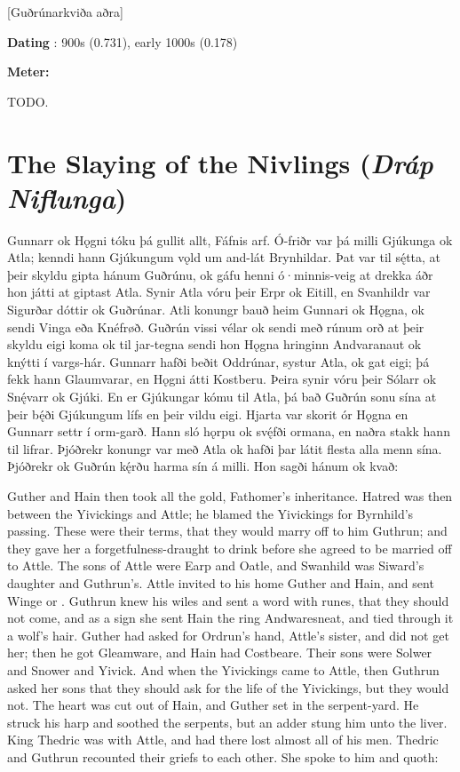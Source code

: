 [Guðrúnarkviða aðra]

\begin{flushright}%
\textbf{Dating} \parencite{Sapp2022}: 900s (0.731), early 1000s (0.178)

\textbf{Meter:} \Fornyrdislag%
\end{flushright}

TODO.

\sectionline

\section{The Slaying of the Nivlings (\emph{Dráp Niflunga})}

\bpg\bpa Gunnarr ok Hǫgni tóku þá gullit allt, Fáfnis arf. Ó-friðr var þá milli Gjúkunga ok Atla; kenndi hann Gjúkungum vǫld um and-lát Brynhildar. Þat var til sę́tta, at þeir skyldu gipta hánum Guðrúnu, ok gáfu henni ó·minnis-veig at drekka áðr hon játti at giptast Atla. Synir Atla vóru þeir Erpr ok Eitill, en Svanhildr var Sigurðar dóttir ok Guðrúnar. Atli konungr bauð heim Gunnari ok Hǫgna, ok sendi Vinga eða Knéfrøð. Guðrún vissi vélar ok sendi með rúnum orð at þeir skyldu eigi koma ok til jar-tegna sendi hon Hǫgna hringinn Andvaranaut ok knýtti í vargs-hár. Gunnarr hafði beðit Oddrúnar, systur Atla, ok gat eigi; þá fekk hann Glaumvarar, en Hǫgni átti Kostberu. Þeira synir vóru þeir Sólarr ok Snę́varr ok Gjúki. En er Gjúkungar kómu til Atla, þá bað Guðrún sonu sína at þeir bę́ði Gjúkungum lífs en þeir vildu eigi. Hjarta var skorit ór Hǫgna en Gunnarr settr í orm-garð. Hann sló hǫrpu ok svę́fði ormana, en naðra stakk hann til lifrar. Þjóðrekr konungr var með Atla ok hafði þar látit flesta alla menn sína. Þjóðrekr ok Guðrún kę́rðu harma sín á milli. Hon sagði hánum ok kvað:\epa

\bpb Guther and Hain then took all the gold, Fathomer’s inheritance.  Hatred was then between the Yivickings and Attle; he blamed the Yivickings for Byrnhild’s passing.  These were their terms, that they would marry off to him Guthrun; and they gave her a forgetfulness-draught to drink before she agreed to be married off to Attle. The sons of Attle were Earp and Oatle, and Swanhild was Siward’s daughter and Guthrun’s. Attle invited to his home Guther and Hain, and sent Winge or . Guthrun knew his wiles and sent a word with runes, that they should not come, and as a sign she sent Hain the ring Andwaresneat, and tied through it a wolf’s hair. Guther had asked for Ordrun’s hand, Attle’s sister, and did not get her; then he got Gleamware, and Hain had Costbeare. Their sons were Solwer and Snower and Yivick. And when the Yivickings came to Attle, then Guthrun asked her sons that they should ask for the life of the Yivickings, but they would not. The heart was cut out of Hain, and Guther set in the serpent-yard. He struck his harp and soothed the serpents, but an adder stung him unto the liver. King Thedric was with Attle, and had there lost almost all of his men. Thedric and Guthrun recounted their griefs to each other. She spoke to him and quoth:\epb\epg

